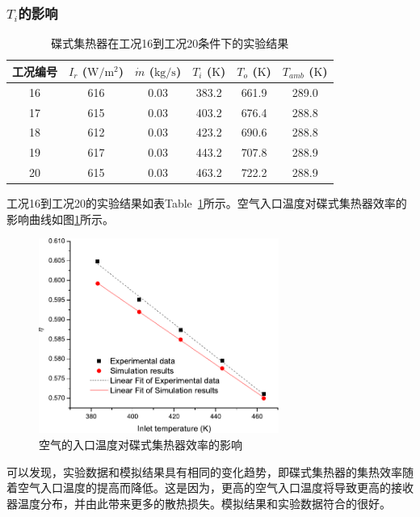 \subsubsection{$T_i$的影响}

\begin{table}[htbp]\footnotesize
\setlength{\abovecaptionskip}{-10pt}
	\caption{碟式集热器在工况16到工况20条件下的实验结果}
	\begin{center}
	\begin{tabular}{cccccc}
		\toprule
		工况编号	& $I_r$ ($\mathrm{W/m^2}$)	&	$\dot{m}$ ($\mathrm{kg/s}$)			&	$T_i$ ($\mathrm{K}$)	&	$T_o$ ($\mathrm{K}$)		&	$T_{amb}$ ($\mathrm{K}$)\\
		\midrule
		16	&	616	&	0.03	&	383.2	&	661.9	&	289.0\\
		17	&	615	&	0.03	&	403.2	&	676.4	&	288.8\\
		18	&	612	&	0.03	&	423.2	&	690.6	&	288.8	\\
		19	&	617	&	0.03	&	443.2	&	707.8	&	288.9\\
		20	&	615	&	0.03	&	463.2	&	722.2	&	288.9\\
		\bottomrule
	\end{tabular}
	\end{center}
	\label{tab:ResultOfDish3}
\end{table}
工况16到工况20的实验结果如表Table~\ref{tab:ResultOfDish3}所示。空气入口温度对碟式集热器效率的影响曲线如图\ref{fig:T_i-eta-dish}所示。
\begin{figure}[!ht]
\centering
\includegraphics[width=0.7\textwidth]{fig/T_i-eta-dish}
\caption{空气的入口温度对碟式集热器效率的影响}
\label{fig:T_i-eta-dish}
\end{figure}

可以发现，实验数据和模拟结果具有相同的变化趋势，即碟式集热器的集热效率随着空气入口温度的提高而降低。这是因为，更高的空气入口温度将导致更高的接收器温度分布，并由此带来更多的散热损失。模拟结果和实验数据符合的很好。

